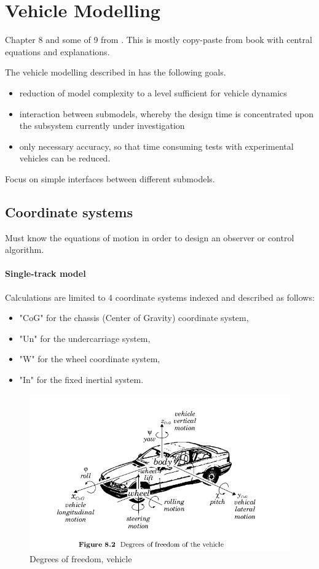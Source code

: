 \section{Vehicle Modelling}
Chapter 8 and some of 9 from \cite{kiencke}. This is mostly copy-paste from book with central equations and explanations.

The vehicle modelling described in \cite{kiencke} has the following goals.
\begin{itemize}
    \item reduction of model complexity to a level sufficient for vehicle dynamics
   \item interaction between submodels, whereby the design time is concentrated upon the subsystem currently under investigation 
   \item only necessary accuracy, so that time consuming tests with experimental vehicles can be reduced.
\end{itemize}

Focus on simple interfaces between different submodels.

\subsection{Coordinate systems}
Must know the equations of motion in order to design an observer or control algorithm. 

\paragraph{Single-track model}

Calculations are limited to 4 coordinate systems indexed and described as follows:
\begin{itemize}
    \item "CoG" for the chassis (Center of Gravity) coordinate system,
    \item "Un" for the undercarriage system,
    \item "W" for the wheel coordinate system,
    \item "In" for the fixed inertial system.
\end{itemize}

\begin{figure}
    \centering
    \includegraphics[width=\textwidth]{draft/stolen-figures/dof-vehicle.png}
    \caption{Degrees of freedom, vehicle}
    \label{fig:dof-vehicle}
\end{figure}

